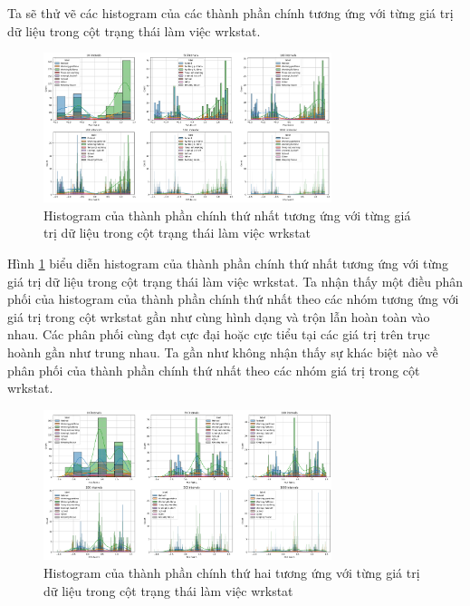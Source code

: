 Ta sẽ thử vẽ các histogram của các thành phần chính tương ứng với từng giá trị dữ liệu trong cột trạng thái làm việc wrkstat.

\begin{figure}[H]
    \centering
    \includegraphics[width=0.75\textwidth]{figures/Thanh/Data_Analysis/With_null_histogram_PCA_feature_0_vs_wrkstat_labels.png}
    \caption{Histogram của thành phần chính thứ nhất tương ứng với từng giá trị dữ liệu trong cột trạng thái làm việc wrkstat}
    \label{fig:With_null_histogram_PCA_feature_0_vs_wrkstat_labels}
\end{figure}

Hình \ref{fig:With_null_histogram_PCA_feature_0_vs_wrkstat_labels} biểu diễn histogram của thành phần chính thứ nhất tương ứng với từng giá trị dữ liệu trong cột trạng thái làm việc wrkstat.
Ta nhận thấy một điều phân phối của histogram của thành phần chính thứ nhất theo các nhóm tương ứng với giá trị trong cột wrkstat gần như cùng hình dạng và trộn lẫn hoàn toàn vào nhau.
Các phân phối cùng đạt cực đại hoặc cực tiểu tại các giá trị trên trục hoành gần như trung nhau.
Ta gần như không nhận thấy sự khác biệt nào về phân phối của thành phần chính thứ nhất theo các nhóm giá trị trong cột wrkstat.

\begin{figure}[H]
    \centering
    \includegraphics[width=0.75\textwidth]{figures/Thanh/Data_Analysis/With_null_histogram_PCA_feature_1_vs_wrkstat_labels.png}
    \caption{Histogram của thành phần chính thứ hai tương ứng với từng giá trị dữ liệu trong cột trạng thái làm việc wrkstat}
    \label{fig:With_null_histogram_PCA_feature_1_vs_wrkstat_labels}
\end{figure}

